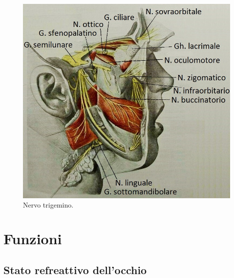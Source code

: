 \begin{figure}[h!]
	\centering
	\includegraphics[scale=0.7]{source/immagini/nervo_trigemino.jpg}
	\caption[figure]{Nervo trigemino.}
	\label{fig:issuexample}
\end{figure}

\section{Funzioni}

\subsection{Stato refreattivo dell'occhio}

